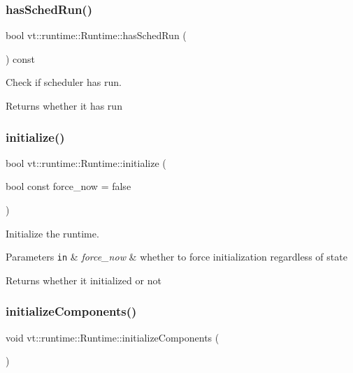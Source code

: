 \subsubsection{\texorpdfstring{has\+Sched\+Run()}{hasSchedRun()}}
{\footnotesize\ttfamily bool vt\+::runtime\+::\+Runtime\+::has\+Sched\+Run (\begin{DoxyParamCaption}{ }\end{DoxyParamCaption}) const}



Check if scheduler has run. 

\begin{DoxyReturn}{Returns}
whether it has run 
\end{DoxyReturn}
\mbox{\label{structvt_1_1runtime_1_1_runtime_a7590edf43fad3a219ef9335a97f4aebb}} 
\subsubsection{\texorpdfstring{initialize()}{initialize()}}
{\footnotesize\ttfamily bool vt\+::runtime\+::\+Runtime\+::initialize (\begin{DoxyParamCaption}\item[{bool const}]{force\+\_\+now = {\ttfamily false} }\end{DoxyParamCaption})}



Initialize the runtime. 


\begin{DoxyParams}[1]{Parameters}
\mbox{\tt in}  & {\em force\+\_\+now} & whether to force initialization regardless of state\\
\hline
\end{DoxyParams}
\begin{DoxyReturn}{Returns}
whether it initialized or not 
\end{DoxyReturn}
\mbox{\label{structvt_1_1runtime_1_1_runtime_a798be8c8813889ef0aacdbc8668d8a41}} 
\subsubsection{\texorpdfstring{initialize\+Components()}{initializeComponents()}}
{\footnotesize\ttfamily void vt\+::runtime\+::\+Runtime\+::initialize\+Components (\begin{DoxyParamCaption}{ }\end{DoxyParamCaption})\hspace{0.3cm}{\ttfamily [protected]}}



